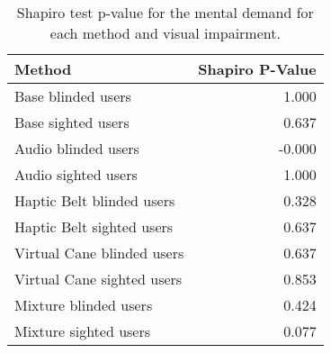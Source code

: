 
\begin{table}[!htb]
\centering
\caption{Shapiro test p-value for the mental demand for each method and visual impairment.}
\label{tab:shapiro_mental_demand}
\begin{tabular}{lr}
\toprule
                    Method &  Shapiro P-Value \\
\midrule
        Base blinded users &            1.000 \\
        Base sighted users &            0.637 \\
       Audio blinded users &           -0.000 \\
       Audio sighted users &            1.000 \\
 Haptic Belt blinded users &            0.328 \\
 Haptic Belt sighted users &            0.637 \\
Virtual Cane blinded users &            0.637 \\
Virtual Cane sighted users &            0.853 \\
     Mixture blinded users &            0.424 \\
     Mixture sighted users &            0.077 \\
\bottomrule
\end{tabular}
\end{table}

